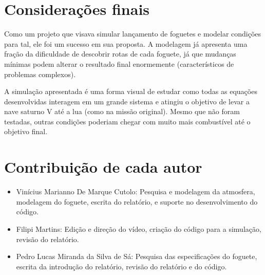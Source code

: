 \section{Considerações finais}

Como um projeto que visava simular lançamento de foguetes e modelar condições para tal, ele foi um sucesso em sua proposta. A modelagem já apresenta uma fração da dificuldade de descobrir rotas de cada foguete, já que mudanças mínimas podem alterar o resultado final enormemente (característicos de problemas complexos).

A simulação apresentada é uma forma visual de estudar como todas as equações desenvolvidas interagem em um grande sistema e atingiu o objetivo de levar a nave saturno V até a lua (como na missão original). Mesmo que não foram testadas, outras condições poderiam chegar com muito mais combustível até o objetivo final.

\section{Contribuição de cada autor}

\begin{itemize}[leftmargin=*]
    \item Vinícius Marianno De Marque Cutolo: Pesquisa e modelagem da atmosfera, modelagem do foguete, escrita do relatório, e suporte no desenvolvimento do código.
    \item Filipi Martins: Edição e direção do vídeo, criação do código para a simulação, revisão do relatório.
    \item Pedro Lucas Miranda da Silva de Sá: Pesquisa das especificações do foguete, escrita da introdução do relatório, revisão do relatório e do código.
\end{itemize}

\ifdefined\LivroPrincipal
\else
  \printbibliography[heading=bibintoc,title={Referências}]
\fi
\FinalizaCapitulo

